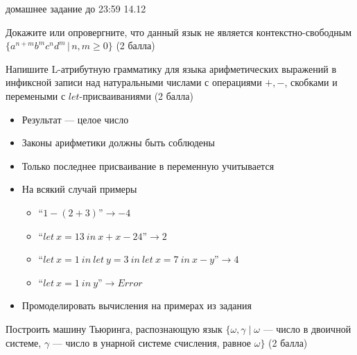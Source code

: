 \documentclass[12pt]{article}
\begin{document}

{\Large домашнее задание до 23:59 14.12}
\bigskip

\begin{enumerate}
{
  \item Докажите или опровергните, что данный язык не является контекстно-свободным $\{ a^{n+m} b^m c^n d^m \, | \, n, m \geq 0 \}$ (2 балла)
  \item {Напишите L-атрибутную грамматику для языка арифметических выражений в инфиксной записи над натуральными числами с операциями $+, -$, скобками и перемеными с $let$-присваиваниями (2 балла)
  \begin{itemize}
      \item Результат --- целое число
      \item Законы арифметики должны быть соблюдены
      \item Только последнее присваивание в переменную учитывается
      \item На всякий случай примеры
      \begin{itemize}
          \item ``$1-(2+3)$''$ \rightarrow -4$
          \item ``$let \ x = 13 \ in \ x + x - 24$''$ \rightarrow 2$
          \item ``$let \ x = 1 \ in \ let \ y = 3 \ in \ let \ x = 7 \ in \ x - y$''$ \rightarrow 4$
          \item ``$let \ x = 1 \ in \ y $''$ \rightarrow Error $
      \end{itemize}
      \item Промоделировать вычисления на примерах из задания
  \end{itemize}
  }
  \item { Построить машину Тьюринга, распознающую язык $\{ \omega, \gamma \mid \omega$ --- число в двоичной системе, $\gamma$ --- число в унарной системе счисления, равное $\omega \}$ (2 балла) } 
}
\end{enumerate}

 
\end{document}
